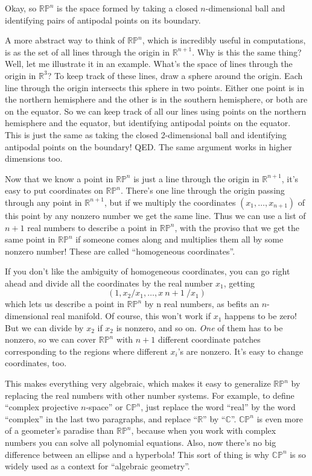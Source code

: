 \documentclass{article}
\begin{document}
Okay, so \(\mathbb{RP}^n\) is the space formed by taking a closed
\(n\)-dimensional ball and identifying pairs of antipodal points on its
boundary.

A more abstract way to think of \(\mathbb{RP}^n\), which is incredibly
useful in computations, is as the set of all lines through the origin in
\(\mathbb{R}^{n+1}\). Why is this the same thing? Well, let me
illustrate it in an example. What's the space of lines through the
origin in \(\mathbb{R}^3\)? To keep track of these lines, draw a sphere
around the origin. Each line through the origin intersects this sphere
in two points. Either one point is in the northern hemisphere and the
other is in the southern hemisphere, or both are on the equator. So we
can keep track of all our lines using points on the northern hemisphere
and the equator, but identifying antipodal points on the equator. This
is just the same as taking the closed 2-dimensional ball and identifying
antipodal points on the boundary! QED. The same argument works in higher
dimensions too.

Now that we know a point in \(\mathbb{RP}^n\) is just a line through the
origin in \(\mathbb{R}^{n+1}\), it's easy to put coordinates on
\(\mathbb{RP}^n\). There's one line through the origin passing through
any point in \(\mathbb{R}^{n+1}\), but if we multiply the coordinates
\((x_1,\ldots,x_{n+1})\) of this point by any nonzero number we get the
same line. Thus we can use a list of \(n+1\) real numbers to describe a
point in \(\mathbb{RP}^n\), with the proviso that we get the same point
in \(\mathbb{RP}^n\) if someone comes along and multiplies them all by
some nonzero number! These are called ``homogeneous coordinates''.

If you don't like the ambiguity of homogeneous coordinates, you can go
right ahead and divide all the coordinates by the real number \(x_1\),
getting \[(1, x_2/x_1, \ldots , x~n+1~/x_1)\] which lets us describe a
point in \(\mathbb{RP}^n\) by n real numbers, as befits an
\(n\)-dimensional real manifold. Of course, this won't work if \(x_1\)
happens to be zero! But we can divide by \(x_2\) if \(x_2\) is nonzero,
and so on. \emph{One} of them has to be nonzero, so we can cover
\(\mathbb{RP}^n\) with \(n+1\) different coordinate patches
corresponding to the regions where different \(x_i\)'s are nonzero. It's
easy to change coordinates, too.

This makes everything very algebraic, which makes it easy to generalize
\(\mathbb{RP}^n\) by replacing the real numbers with other number
systems. For example, to define ``complex projective \(n\)-space'' or
\(\mathbb{CP}^n\), just replace the word ``real'' by the word
``complex'' in the last two paragraphs, and replace ``\(\mathbb{R}\)''
by ``\(\mathbb{C}\)''. \(\mathbb{CP}^n\) is even more of a geometer's
paradise than \(\mathbb{RP}^n\), because when you work with complex
numbers you can solve all polynomial equations. Also, now there's no big
difference between an ellipse and a hyperbola! This sort of thing is why
\(\mathbb{CP}^n\) is so widely used as a context for ``algebraic
geometry''.
\end{document}
